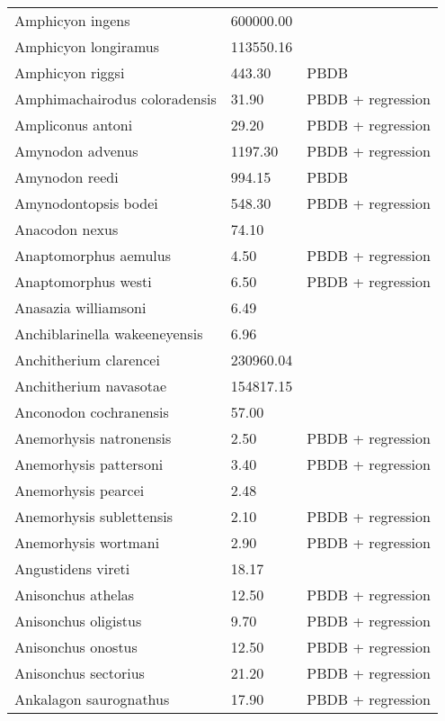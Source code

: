\begin{longtable}{p{} p{} p{}}
    Amphicyon ingens & 600000.00 & \cite{Sorkin2008} \\ 
    Amphicyon longiramus & 113550.16 & \cite{Tomiya2013} \\ 
    Amphicyon riggsi & 443.30 & PBDB \\ 
    Amphimachairodus coloradensis & 31.90 & PBDB + regression \\ 
    Ampliconus antoni & 29.20 & PBDB + regression \\ 
    Amynodon advenus & 1197.30 & PBDB + regression \\ 
    Amynodon reedi & 994.15 & PBDB \\ 
    Amynodontopsis bodei & 548.30 & PBDB + regression \\ 
    Anacodon nexus & 74.10 & \cite{Heissig2012a} \\ 
    Anaptomorphus aemulus & 4.50 & PBDB + regression \\ 
    Anaptomorphus westi & 6.50 & PBDB + regression \\ 
    Anasazia williamsoni & 6.49 & \cite{Williamson2012} \\ 
    Anchiblarinella wakeeneyensis & 6.96 & \cite{Tomiya2013} \\ 
    Anchitherium clarencei & 230960.04 & \cite{Tomiya2013} \\ 
    Anchitherium navasotae & 154817.15 & \cite{Tomiya2013} \\ 
    Anconodon cochranensis & 57.00 & \cite{Wilson2012} \\ 
    Anemorhysis natronensis & 2.50 & PBDB + regression \\ 
    Anemorhysis pattersoni & 3.40 & PBDB + regression \\ 
    Anemorhysis pearcei & 2.48 & \cite{Albright2000} \\ 
    Anemorhysis sublettensis & 2.10 & PBDB + regression \\ 
    Anemorhysis wortmani & 2.90 & PBDB + regression \\ 
    Angustidens vireti & 18.17 & \cite{Tomiya2013} \\ 
    Anisonchus athelas & 12.50 & PBDB + regression \\ 
    Anisonchus oligistus & 9.70 & PBDB + regression \\ 
    Anisonchus onostus & 12.50 & PBDB + regression \\ 
    Anisonchus sectorius & 21.20 & PBDB + regression \\ 
    Ankalagon saurognathus & 17.90 & PBDB + regression \\ 

\end{longtable}
